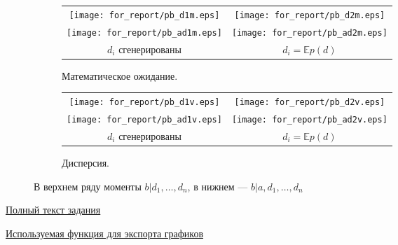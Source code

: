 \documentclass[12pt,a4paper]{article}
\begin{document}
\begin{figure}[p]
  \centering
  \begin{subfigure}[b]{0.48\textwidth}
    \centering
    \begin{tabular}{cc}
      \texttt{[image: for\_report/pb\_d1m.eps]} &
      \texttt{[image: for\_report/pb\_d2m.eps]} \\
      \texttt{[image: for\_report/pb\_ad1m.eps]} &
      \texttt{[image: for\_report/pb\_ad2m.eps]} \\
      $d_i$ сгенерированы & 
      $d_i = \mathbb{E}p(d)$ 
    \end{tabular}
    \caption{Математическое ожидание.}
  \end{subfigure}
  \begin{subfigure}[b]{0.48\textwidth}
    \centering
    \begin{tabular}{cc}
      \texttt{[image: for\_report/pb\_d1v.eps]} &
      \texttt{[image: for\_report/pb\_d2v.eps]} \\
      \texttt{[image: for\_report/pb\_ad1v.eps]} &
      \texttt{[image: for\_report/pb\_ad2v.eps]} \\
      $d_i$ сгенерированы & 
      $d_i = \mathbb{E}p(d)$ 
    \end{tabular}
    \caption{Дисперсия.}
  \end{subfigure}
  \caption{В верхнем ряду моменты $b|d_1,\dots,d_n$, в нижнем --- $b|a,d_1,\dots,d_n$}
  \label{fig:mv}
\end{figure}

\begin{thebibliography}{0}

  \href{http://www.machinelearning.ru/wiki/index.php?title=%D0%93%D1%80%D0%B0%D1%84%D0%B8%D1%87%D0%B5%D1%81%D0%BA%D0%B8%D0%B5_%D0%BC%D0%BE%D0%B4%D0%B5%D0%BB%D0%B8_%28%D0%BA%D1%83%D1%80%D1%81_%D0%BB%D0%B5%D0%BA%D1%86%D0%B8%D0%B9%29/2014/%D0%97%D0%B0%D0%B4%D0%B0%D0%BD%D0%B8%D0%B5_1}{Полный текст задания}

  \href{https://www.google.ru/url?sa=t&rct=j&q=&esrc=s&source=web&cd=1&ved=0CCkQFjAA&url=http%3A%2F%2Fwww.mathworks.com%2Fmatlabcentral%2Ffileexchange%2F23629-exportfig&ei=B4wNU-eHJYva4QS0wYGQAw&usg=AFQjCNEhL-HxuJ6pWzFD4LyUVngfW8fFFw&sig2=Ap03ODZFTZ3aY95uWxcTow&cad=rja}{Используемая функция для экспорта графиков}

\end{thebibliography}
\end{document}
